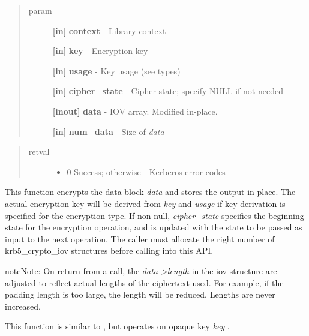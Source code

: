 \documentclass[letterpaper,10pt,english]{sphinxmanual}
\begin{document}
\begin{quote}\begin{description}
\item[{param}] \leavevmode
\textbf{{[}in{]}} \textbf{context} - Library context

\textbf{{[}in{]}} \textbf{key} - Encryption key

\textbf{{[}in{]}} \textbf{usage} - Key usage (see  types)

\textbf{{[}in{]}} \textbf{cipher\_state} - Cipher state; specify NULL if not needed

\textbf{{[}inout{]}} \textbf{data} - IOV array. Modified in-place.

\textbf{{[}in{]}} \textbf{num\_data} - Size of \emph{data}

\end{description}\end{quote}
\begin{quote}\begin{description}
\item[{retval}] \leavevmode\begin{itemize}
\item {} 
0   Success; otherwise - Kerberos error codes

\end{itemize}

\end{description}\end{quote}

This function encrypts the data block \emph{data} and stores the output in-place. The actual encryption key will be derived from \emph{key} and \emph{usage} if key derivation is specified for the encryption type. If non-null, \emph{cipher\_state} specifies the beginning state for the encryption operation, and is updated with the state to be passed as input to the next operation. The caller must allocate the right number of krb5\_crypto\_iov structures before calling into this API.




{\hyperref[appdev/refs/api/krb5_k_decrypt_iov:c.krb5_k_decrypt_iov]{}}



\begin{notice}{note}{Note:}
On return from a {\hyperref[appdev/refs/api/krb5_c_encrypt_iov:c.krb5_c_encrypt_iov]{}} call, the \emph{data-\textgreater{}length} in the iov structure are adjusted to reflect actual lengths of the ciphertext used. For example, if the padding length is too large, the length will be reduced. Lengths are never increased.

This function is similar to {\hyperref[appdev/refs/api/krb5_c_encrypt_iov:c.krb5_c_encrypt_iov]{}} , but operates on opaque key \emph{key} .
\end{notice}
\end{document}

